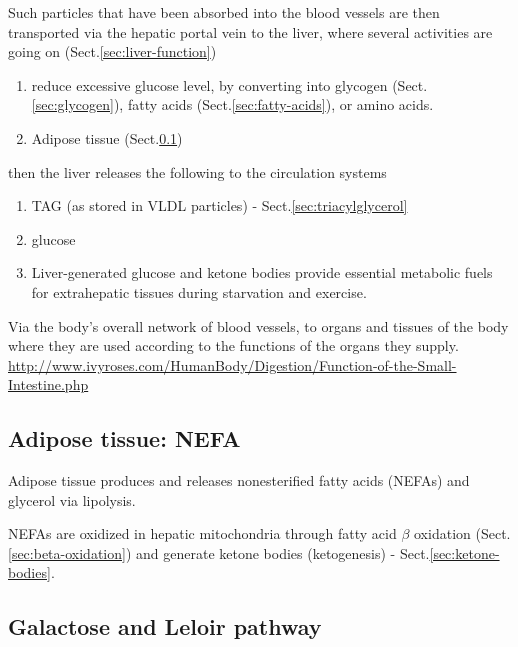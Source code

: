 Such particles that have been absorbed into the blood vessels are then
transported via the hepatic portal vein to the liver, where several activities
are going on (Sect.\ref{sec:liver-function})
\begin{enumerate}
  \item reduce excessive glucose level, by converting into glycogen
  (Sect.\ref{sec:glycogen}), fatty acids (Sect.\ref{sec:fatty-acids}), or amino
  acids.
  
  \item Adipose tissue (Sect.\ref{sec:adipose-tissue})
\end{enumerate}

then the liver releases the following to the circulation systems
\begin{enumerate}
  \item TAG (as stored in VLDL particles) - Sect.\ref{sec:triacylglycerol}

  
  \item glucose
  
  \item Liver-generated glucose and ketone bodies provide essential metabolic
  fuels for extrahepatic tissues during starvation and exercise.
  
\end{enumerate}

Via the body's overall network of blood vessels, to organs and tissues of the
body where they are used according to the functions of the organs they supply.
\url{http://www.ivyroses.com/HumanBody/Digestion/Function-of-the-Small-Intestine.php}

\subsection{Adipose tissue: NEFA}
\label{sec:adipose-tissue}
\label{sec:NEFA}

Adipose tissue produces and releases nonesterified fatty acids (NEFAs) and
glycerol via lipolysis. 

NEFAs are oxidized in hepatic mitochondria through fatty acid $\beta$ oxidation
(Sect.\ref{sec:beta-oxidation}) and generate ketone bodies (ketogenesis) -
Sect.\ref{sec:ketone-bodies}.

\subsection{Galactose and Leloir pathway}
\label{sec:galactose}
\label{sec:Leloir-pathway}

